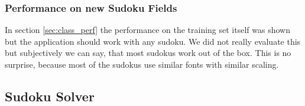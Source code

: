 \documentclass[
a4paper,     %
12pt         %
]{scrartcl}  %
\begin{document}
\subsubsection{Performance on new Sudoku Fields}

In section \ref{sec:class_perf} the performance on the training set itself was shown but the application
should work with any sudoku. We did not really evaluate this but subjectively we can say, that most
sudokus work out of the box. This is no surprise, because most of the sudokus use similar fonts with
similar scaling.

\subsection{Sudoku Solver}
\label{imp_sudoku_solver}
\end{document}
